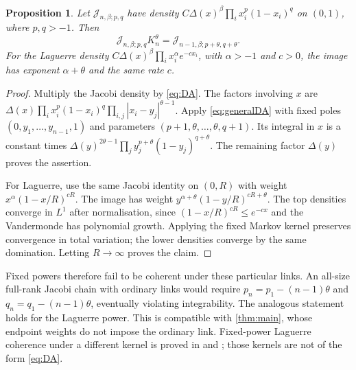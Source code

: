 \documentclass[10pt]{amsart}
\newtheorem{proposition}[theorem]{Proposition}
\newcommand{\Jac}{\mathcal J}
\begin{document}
\begin{proposition}\label{prop:shift}
Let $\Jac_{n,\beta;p,q}$ have density
$C\Delta(x)^\beta\prod_i x_i^p(1-x_i)^q$ on $(0,1)$, where
$p,q>-1$. Then
\[
 \Jac_{n,\beta;p,q}K_n^\theta
 =\Jac_{n-1,\beta;p+\theta,q+\theta}.
\]
For the Laguerre density $C\Delta(x)^\beta\prod_i x_i^\alpha e^{-cx_i}$,
with $\alpha>-1$ and $c>0$, the image has exponent $\alpha+\theta$
and the same rate $c$.
\end{proposition}
\begin{proof}
Multiply the Jacobi density by \eqref{eq:DA}. The factors involving
$x$ are $\Delta(x)\prod_i x_i^p(1-x_i)^q
\prod_{i,j}|x_i-y_j|^{\theta-1}$. Apply \eqref{eq:generalDA}
with fixed poles $(0,y_1,\ldots,y_{n-1},1)$ and parameters
$(p+1,\theta,\ldots,\theta,q+1)$. Its integral in $x$ is a constant
times $\Delta(y)^{2\theta-1}\prod_j y_j^{p+\theta}(1-y_j)^{q+\theta}$.
The remaining factor $\Delta(y)$ proves the assertion.

For Laguerre, use the same Jacobi identity on $(0,R)$ with weight
$x^\alpha(1-x/R)^{cR}$. The image has weight
$y^{\alpha+\theta}(1-y/R)^{cR+\theta}$.
The top densities converge in $L^1$ after normalisation, since
$(1-x/R)^{cR}\leq e^{-cx}$ and the Vandermonde has polynomial
growth. Applying the fixed Markov kernel preserves convergence
in total variation; the lower densities converge by the same
domination. Letting $R\to\infty$ proves the claim.
\end{proof}
Fixed powers therefore fail to be coherent under these particular
links. An all-size full-rank Jacobi chain with ordinary links would
require $p_n=p_1-(n-1)\theta$ and $q_n=q_1-(n-1)\theta$, eventually
violating integrability. The analogous statement holds for the
Laguerre power. This is compatible with \cref{thm:main}, whose
endpoint weights do not impose the ordinary link. Fixed-power
Laguerre coherence under a different kernel is proved in \cite{BK}
and \cite{KS}; those kernels are not of the form \eqref{eq:DA}.
\end{document}
